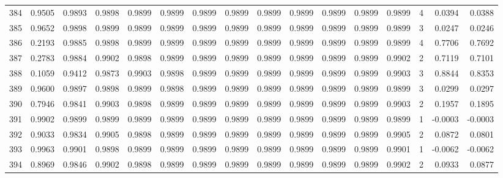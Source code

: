 \begin{tabular}{lrrrrrrrrrrrrrrr}
384 &      0.9505 &  0.9893 &  0.9898 &  0.9899 &  0.9899 &  0.9899 &  0.9899 &  0.9899 &  0.9899 &  0.9899 &   0.9899 &     0.9899 &      4 &                    0.0394 &                     0.0388 \\
385 &      0.9652 &  0.9898 &  0.9899 &  0.9899 &  0.9899 &  0.9899 &  0.9899 &  0.9899 &  0.9899 &  0.9899 &   0.9899 &     0.9899 &      3 &                    0.0247 &                     0.0246 \\
386 &      0.2193 &  0.9885 &  0.9898 &  0.9899 &  0.9899 &  0.9899 &  0.9899 &  0.9899 &  0.9899 &  0.9899 &   0.9899 &     0.9899 &      4 &                    0.7706 &                     0.7692 \\
387 &      0.2783 &  0.9884 &  0.9902 &  0.9898 &  0.9899 &  0.9899 &  0.9899 &  0.9899 &  0.9899 &  0.9899 &   0.9899 &     0.9902 &      2 &                    0.7119 &                     0.7101 \\
388 &      0.1059 &  0.9412 &  0.9873 &  0.9903 &  0.9898 &  0.9899 &  0.9899 &  0.9899 &  0.9899 &  0.9899 &   0.9899 &     0.9903 &      3 &                    0.8844 &                     0.8353 \\
389 &      0.9600 &  0.9897 &  0.9898 &  0.9899 &  0.9898 &  0.9899 &  0.9899 &  0.9899 &  0.9899 &  0.9899 &   0.9899 &     0.9899 &      3 &                    0.0299 &                     0.0297 \\
390 &      0.7946 &  0.9841 &  0.9903 &  0.9898 &  0.9899 &  0.9899 &  0.9899 &  0.9899 &  0.9899 &  0.9899 &   0.9899 &     0.9903 &      2 &                    0.1957 &                     0.1895 \\
391 &      0.9902 &  0.9899 &  0.9899 &  0.9899 &  0.9899 &  0.9899 &  0.9899 &  0.9899 &  0.9899 &  0.9899 &   0.9899 &     0.9899 &      1 &                   -0.0003 &                    -0.0003 \\
392 &      0.9033 &  0.9834 &  0.9905 &  0.9898 &  0.9899 &  0.9899 &  0.9899 &  0.9899 &  0.9899 &  0.9899 &   0.9899 &     0.9905 &      2 &                    0.0872 &                     0.0801 \\
393 &      0.9963 &  0.9901 &  0.9898 &  0.9899 &  0.9899 &  0.9899 &  0.9899 &  0.9899 &  0.9899 &  0.9899 &   0.9899 &     0.9901 &      1 &                   -0.0062 &                    -0.0062 \\
394 &      0.8969 &  0.9846 &  0.9902 &  0.9898 &  0.9899 &  0.9899 &  0.9899 &  0.9899 &  0.9899 &  0.9899 &   0.9899 &     0.9902 &      2 &                    0.0933 &                     0.0877 \\

\end{tabular}
